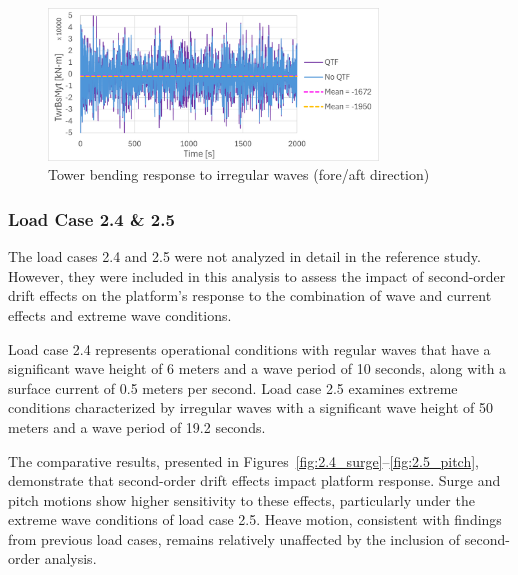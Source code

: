 \documentclass[a4paper, 11pt]{article}
\begin{document}
\begin{figure}[H]
    \centering
    \includegraphics[width=0.78\textwidth]{2.2_twr.png}
    \caption{\small Tower bending response to irregular waves (fore/aft direction)}
    \label{fig:2.2_twr}
\end{figure}

\subsubsection{Load Case 2.4 \& 2.5}
\hspace{0.5cm}The load cases 2.4 and 2.5 were not analyzed in detail in the reference study. However, they were included in this analysis to assess the impact of second-order drift effects on the platform's response to the combination of wave and current effects and extreme wave conditions.

Load case 2.4 represents operational conditions with regular waves that have a significant wave height of 6 meters and a wave period of 10 seconds, along with a surface current of 0.5 meters per second. Load case 2.5 examines extreme conditions characterized by irregular waves with a significant wave height of 50 meters and a wave period of 19.2 seconds.

The comparative results, presented in Figures~\ref{fig:2.4_surge}--\ref{fig:2.5_pitch}, demonstrate that second-order drift effects impact platform response. Surge and pitch motions show higher sensitivity to these effects, particularly under the extreme wave conditions of load case 2.5. Heave motion, consistent with findings from previous load cases, remains relatively unaffected by the inclusion of second-order analysis.
\end{document}
